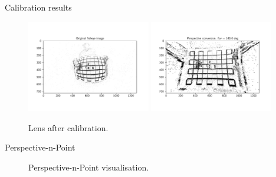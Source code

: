 \documentclass{beamer}
\begin{document}

\begin{frame}{Calibration results}
    \begin{figure}
        \centering
        \includegraphics[width=0.48\textwidth]{./fig/pgfplot/build/ent_before.pdf}
        \includegraphics[width=0.48\textwidth]{./fig/pgfplot/build/ent_after.pdf}
        \caption{Lens after calibration.}
        \label{fig:calib_after}
    \end{figure}
\end{frame}

\begin{frame}{Perspective-n-Point}

\begin{figure}[H]
    \centering
    \hspace{1em}%
    \label{fig:pnp}
    \caption{Perspective-n-Point visualisation.}
\end{figure}



\end{frame}
\end{document}
